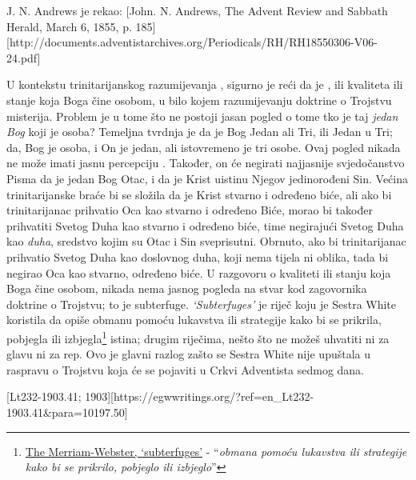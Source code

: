 J. N. Andrews je rekao: [John. N. Andrews, The Advent Review and Sabbath Herald, March 6, 1855, p. 185][http://documents.adventistarchives.org/Periodicals/RH/RH18550306-V06-24.pdf]

U kontekstu trinitarijanskog razumijevanja , sigurno je reći da je , ili kvaliteta ili stanje koja Boga čine osobom, u bilo kojem razumijevanju doktrine o Trojstvu misterija. Problem je u tome što ne postoji jasan pogled o tome tko je taj \textit{jedan Bog} koji je osoba? Temeljna tvrdnja je da je Bog Jedan ali Tri, ili Jedan u Tri; da, Bog je osoba, i On je jedan, ali istovremeno je tri osobe. Ovaj pogled nikada ne može imati jasnu percepciju . Također, on će negirati najjasnije svjedočanstvo Pisma da je jedan Bog Otac, i da je Krist uistinu Njegov jedinorođeni Sin. Većina trinitarijanske braće bi se složila da je Krist stvarno i određeno biće, ali ako bi trinitarijanac prihvatio Oca kao stvarno i određeno Biće, morao bi također prihvatiti Svetog Duha kao stvarno i određeno biće, time negirajući Svetog Duha kao \textit{duha}, sredstvo kojim su Otac i Sin sveprisutni. Obrnuto, ako bi trinitarijanac prihvatio Svetog Duha kao doslovnog duha, koji nema tijela ni oblika, tada bi negirao Oca kao stvarno, određeno biće. U razgovoru o kvaliteti ili stanju koja Boga čine osobom, nikada nema jasnog pogleda na stvar kod zagovornika doktrine o Trojstvu; to je subterfuge. \textit{‘Subterfuges’} je riječ koju je Sestra White koristila da opiše obmanu pomoću lukavstva ili strategije kako bi se prikrila, pobjegla ili izbjegla\footnote{\href{https://www.merriam-webster.com/dictionary/subterfuges}{The Merriam-Webster, ‘subterfuges’} - “\textit{obmana pomoću lukavstva ili strategije kako bi se prikrilo, pobjeglo ili izbjeglo}”} istina; drugim riječima, nešto što ne možeš uhvatiti ni za glavu ni za rep. Ovo je glavni razlog zašto se Sestra White nije upuštala u raspravu o Trojstvu koja će se pojaviti u Crkvi Adventista sedmog dana.

[Lt232-1903.41; 1903][https://egwwritings.org/?ref=en\_Lt232-1903.41&para=10197.50]

